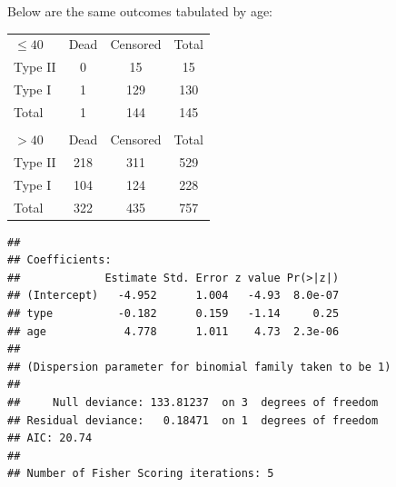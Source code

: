 \documentclass[10pt,handout]{beamer}\usepackage[]{graphicx}\usepackage[]{color}
\makeatletter
\newenvironment{kframe}{%
 \def\at@end@of@kframe{}%
 \ifinner\ifhmode%
  \def\at@end@of@kframe{\end{minipage}}%
  \begin{minipage}{\columnwidth}%
 \fi\fi%
 \def\FrameCommand##1{\hskip\@totalleftmargin \hskip-\fboxsep
 \colorbox{shadecolor}{##1}\hskip-\fboxsep
     \hskip-\linewidth \hskip-\@totalleftmargin \hskip\columnwidth}%
 \MakeFramed {\advance\hsize-\width
   \@totalleftmargin\z@ \linewidth\hsize
   \@setminipage}}%
 {\par\unskip\endMakeFramed%
 \at@end@of@kframe}
\newenvironment{knitrout}{}{} %
\makeatother
\begin{document}
\begin{frame}
	\vspace{-.81in}
\tiny
Below are the same outcomes tabulated by age:

\begin{table}[h]
	\begin{tabular}{lcc|c}
		$\leq 40$ & Dead &  Censored & Total\\
		Type II & 0 & 15 & 15 \\
		Type I & 1 & 129 & 130 \\
		\hline
		Total & 1 & 144 & 145 \\
		& & & \\
		$> 40$ & Dead &  Censored & Total\\
		Type II & 218 & 311 & 529 \\
		Type I & 104 & 124 & 228 \\
		\hline
		Total & 322 & 435 & 757 \\ 
	\end{tabular}
\end{table}

	\vspace{-.21in}
\begin{knitrout}\tiny
{}\color{fgcolor}\begin{kframe}
\begin{verbatim}
## 
## Coefficients:
##             Estimate Std. Error z value Pr(>|z|)
## (Intercept)   -4.952      1.004   -4.93  8.0e-07
## type          -0.182      0.159   -1.14     0.25
## age            4.778      1.011    4.73  2.3e-06
## 
## (Dispersion parameter for binomial family taken to be 1)
## 
##     Null deviance: 133.81237  on 3  degrees of freedom
## Residual deviance:   0.18471  on 1  degrees of freedom
## AIC: 20.74
## 
## Number of Fisher Scoring iterations: 5
\end{verbatim}
\end{kframe}
\end{knitrout}
\end{frame}
\end{document}
